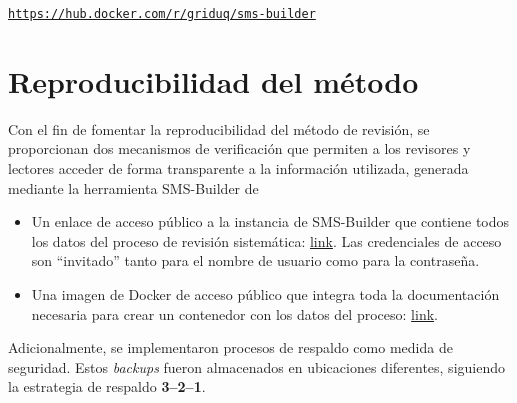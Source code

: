 \begin{center}
	\href{https://hub.docker.com/r/griduq/sms-builder}{\texttt{https://hub.docker.com/r/griduq/sms-builder}}
\end{center}



\section{Reproducibilidad del método}
\noindent
Con el fin de fomentar la reproducibilidad del método de revisión, se proporcionan dos mecanismos de verificación que permiten a los revisores y lectores acceder de forma transparente a la información utilizada, generada mediante la herramienta SMS-Builder de~\cite{SMSBuilder2020}
\begin{itemize}
	\item Un enlace de acceso público a la instancia de SMS-Builder que contiene todos los datos del proceso de revisión sistemática: \href{https://sms-htcondor.iti.grid.uniquindio.edu.co}{link}. Las credenciales de acceso son ``invitado'' tanto para el nombre de usuario como para la contraseña.
	\item Una imagen de Docker de acceso público que integra toda la documentación necesaria para crear un contenedor con los datos del proceso: \href{https://hub.docker.com/r/parritap/sms-htcondor-universes}{link}.
\end{itemize}

\noindent
Adicionalmente, se implementaron procesos de respaldo como medida de seguridad. Estos \textit{backups} fueron almacenados en ubicaciones diferentes, siguiendo la estrategia de respaldo \textbf{3--2--1}.



